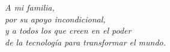 
\thispagestyle{empty}

\vspace*{0.3\textheight}

\begin{flushright}
\textit{A mi familia,\\
por su apoyo incondicional,\\
y a todos los que creen en el poder\\ de la tecnología para transformar el mundo.}
\end{flushright}

\clearpage
